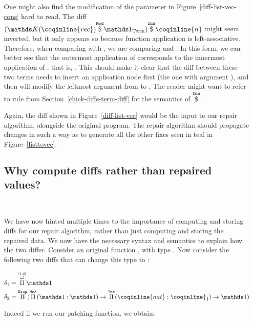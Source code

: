 One might also find the modification of the parameter in
Figure~\ref{diff-list-vec-cons} hard to read.  The diff $\MathInsApp
{(\MathModApp{\MathReplace{\coqinline{vec}}}{\MathSameTerm{}})} {\coqinline{n}}$
might seem inverted, but it only appears so because function application is
left-associative.  Therefore, when comparing  with
, we are comparing  and
.  In this form, we can better see that the
outermost application of  corresponds to the innermost
application of , that is, .  This should make it clear that the diff between these two terms needs to
insert an application node first (the one with argument ), and then
will modify the leftmost argument from  to .  The
reader might want to refer to rule  from
Section~\ref{chick-diffs-term-diff} for the semantics of $\overset{\mathtt{Ins}}{ \$ }$.

Again, the diff shown in Figure~\ref{diff-list-vec} would be the input to our
repair algorithm, alongside the original program.  The repair algorithm should
propagate changes in such a way as to generate all the other fixes seen in teal
in Figure~\ref{listtovec}.

\subsection{Why compute diffs rather than repaired
values?}~\label{chick-diffs-importance}

We have now hinted multiple times to the importance of computing and storing
diffs for our repair algorithm, rather than just computing and storing the
repaired data.  We now have the necessary syntax and semantics to explain how
the two differ.  Consider an original function , with type
.  Now consider the following two diffs that can
change this type to :

\begin{align*}
\delta_{1} & = \MathPermutePis{[1, 0]}{\MathSame{}}\\
\delta_{2} & =
  \MathDropPi{(\MathModPi
             {\MathSame{}}
             {\MathSame{}}
             {\MathInsPi{\coqinline{_}}{\coqinline{nat}}{\MathSame{}}}
             )}
\end{align*}

\noindent%
%
Indeed if we run our patching function, we obtain:

